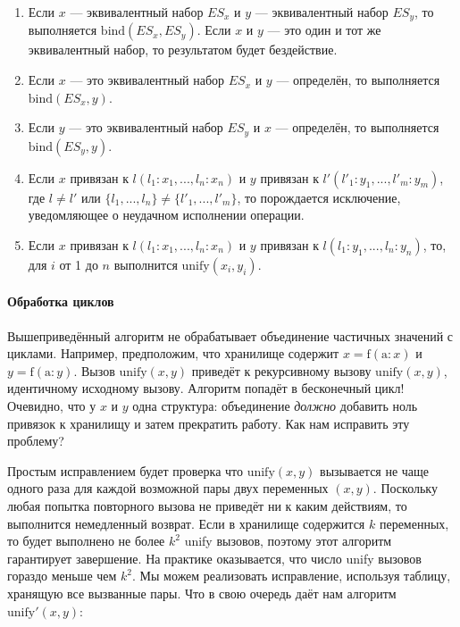 \begin{enumerate}
\item{Если $x$ --- эквивалентный набор $ES_x$ и $y$ --- эквивалентный набор $ES_y$, то выполняется $\text{bind}(ES_x, ES_y)$. Если $x$ и $y$ --- это один и тот же эквивалентный набор, то результатом будет бездействие.}

\item{Если $x$ --- это эквивалентный набор $ES_x$ и $y$ --- определён, то выполняется $\text{bind}(ES_x, y)$.}

\item{Если $y$ --- это эквивалентный набор $ES_y$ и $x$ --- определён, то выполняется $\text{bind}(ES_y, y)$.}

\item{Если $x$ привязан к $l(l_1:x_1, ..., l_n:x_n)$ и $y$ привязан к $l'(l'_1:y_1, ..., l'_m:y_m)$, где $l \neq l'$ или $\{l_1, ..., l_n\} \neq \{l'_1, ..., l'_m\}$, то порождается исключение, уведомляющее о неудачном исполнении операции.}

\item{Если $x$ привязан к $l(l_1:x_1, ..., l_n:x_n)$ и $y$ привязан к $l(l_1:y_1, ..., l_n:y_n)$, то, для $i$ от 1 до $n$ выполнится $\text{unify}(x_i, y_i)$.}
\end{enumerate}

\paragraph{Обработка циклов}

Вышеприведённый алгоритм не обрабатывает объединение частичных значений с циклами. Например, предположим, что хранилище содержит $x=\text{f}(\text{a}:x)$ и $y=\text{f}(\text{a}:y)$. Вызов $\text{unify}(x, y)$ приведёт к рекурсивному вызову $\text{unify}(x, y)$, идентичному исходному вызову. Алгоритм попадёт в бесконечный цикл! Очевидно, что у $x$ и $y$ одна структура: объединение \emph{должно} добавить ноль привязок к хранилищу и затем прекратить работу. Как нам исправить эту проблему?

Простым исправлением будет проверка что $\text{unify}(x, y)$ вызывается не чаще одного раза для каждой возможной пары двух переменных $(x, y)$. Поскольку любая попытка повторного вызова не приведёт ни к каким действиям, то выполнится немедленный возврат. Если в хранилище содержится $k$ переменных, то будет выполнено не более $k^2$ unify вызовов, поэтому этот алгоритм гарантирует завершение. На практике оказывается, что число unify вызовов гораздо меньше чем $k^2$. Мы можем реализовать исправление, используя таблицу, хранящую все вызванные пары. Что в свою очередь даёт нам алгоритм $\text{unify}'(x, y)$:

